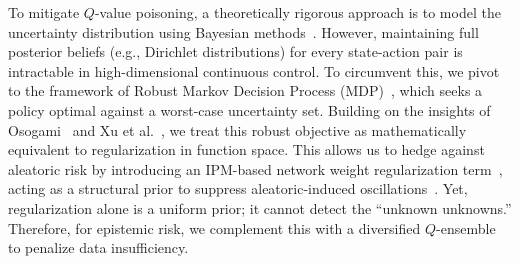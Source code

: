 \documentclass[10pt]{article}
\begin{document}
To mitigate $Q$-value poisoning, a theoretically rigorous approach is to model the uncertainty distribution using Bayesian methods~\cite{Derman2019BayesianRobust, Depeweg2018Decomposition}. However, maintaining full posterior beliefs (e.g., Dirichlet distributions) for every state-action pair is intractable in high-dimensional continuous control. To circumvent this, we pivot to the framework of Robust Markov Decision Process (MDP)~\cite{Wiesemann2013RobustMDP}, which seeks a policy optimal against a worst-case uncertainty set. Building on the insights of Osogami~\cite{Osogami2012Robustness} and Xu et al.~\cite{Xu2009RobustLasso, Xu2009RobustSVM}, we treat this robust objective as mathematically equivalent to regularization in function space. This allows us to hedge against aleatoric risk by introducing an IPM-based network weight regularization term~\cite{Zhou2023NaturalActorCritic, Panaganti2024RobustF}, acting as a structural prior to suppress aleatoric-induced oscillations~\cite{Asadi2018Lipschitz}. Yet, regularization alone is a uniform prior; it cannot detect the ``unknown unknowns.'' Therefore, for epistemic risk, we complement this with a diversified $Q$-ensemble~\cite{An2021UncertaintyEnsemble, Osband2016BootstrappedDQN} to penalize data insufficiency.
\end{document}
